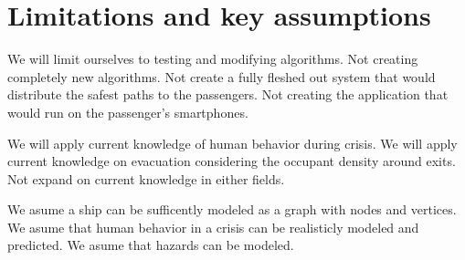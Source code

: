 \chapter{Limitations and key assumptions}
\label{ch:limitations}





We will limit ourselves to testing and modifying algorithms.
Not creating completely new algorithms.
Not create a fully fleshed out system that would distribute the
safest paths to the passengers.
Not creating the application that would run on the passenger's smartphones.

We will apply current knowledge of human behavior during crisis.
We will apply current knowledge on evacuation considering the occupant density around exits.
Not expand on current knowledge in either fields.

We asume a ship can be sufficently modeled as a graph with nodes and vertices. 
We asume that human behavior in a crisis can be realisticly modeled and
predicted. We asume that hazards can be modeled.
